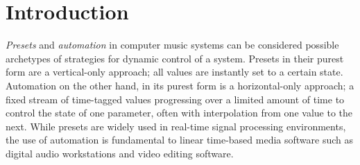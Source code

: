 \documentclass{article}
\begin{document}
\section{Introduction} %
\label{sec:introduction}





\emph{Presets} and \emph{automation} in computer music systems can be considered possible archetypes of strategies for dynamic control of a system. Presets in their purest form are a vertical-only approach; all values are instantly set to a certain state. Automation on the other hand, in its purest form is a horizontal-only approach; a fixed stream of time-tagged values progressing over a limited amount of time to control the state of one parameter, often with interpolation from one value to the next. While presets are widely used in real-time signal processing environments, the use of automation is fundamental to linear time-based media software such as digital audio workstations and video editing software.
\end{document}
